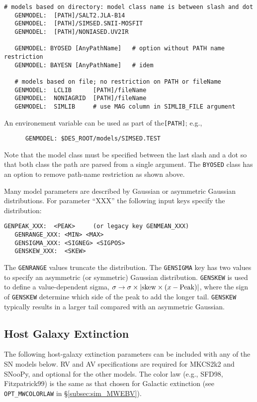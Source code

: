 \documentclass[12pt]{article}
\begin{document}
\begin{Verbatim}[frame=single]
   # models based on directory: model class name is between slash and dot
   GENMODEL:  [PATH]/SALT2.JLA-B14       
   GENMODEL:  [PATH]/SIMSED.SNII-MOSFIT
   GENMODEL:  [PATH]/NONIASED.UV2IR

   GENMODEL: BYOSED [AnyPathName]   # option without PATH name restriction
   GENMODEL: BAYESN [AnyPathName]   # idem

   # models based on file; no restriction on PATH or fileName
   GENMODEL:  LCLIB      [PATH]/fileName
   GENMODEL:  NONIAGRID  [PATH]/fileName
   GENMODEL:  SIMLIB     # use MAG column in SIMLIB_FILE argument
\end{Verbatim}
%
An environement variable can be used as part of the{\tt [PATH]};
e.g., 
\begin{verbatim}
      GENMODEL: $DES_ROOT/models/SIMSED.TEST
\end{verbatim}
%
Note that the model class must be specified between the last slash
and a dot so that both class the path are parsed from a single argument.
The {\tt BYOSED} class has an option to remove path-name restriction
as shown above.


\medskip
Many model parameters are described by Gaussian or asymmetric Gaussian
distributions.  For  parameter ``XXX'' the following input keys
specify the distribution:
\begin{Verbatim}[frame=single]
   GENPEAK_XXX:  <PEAK>     (or legacy key GENMEAN_XXX)
   GENRANGE_XXX: <MIN> <MAX>
   GENSIGMA_XXX: <SIGNEG> <SIGPOS>
   GENSKEW_XXX:  <SKEW>
\end{Verbatim}
%
The {\tt GENRANGE} values truncate the distribution.
The {\tt GENSIGMA} key has two values to specify an 
asymmetric (or symmetric) Gaussian distribution.  
{\tt GENSKEW} is used to define a value-dependent sigma,
$\sigma \to \sigma\times \vert{\rm skew}\times (x - {\rm Peak})\vert$,
where the sign of {\tt GENSKEW} determine which side of
the peak to add the longer tail.
{\tt GENSKEW} typically results in a larger tail compared with
an asymmetric Gaussian.

\clearpage
\subsection{Host Galaxy Extinction}
\label{subsec:host_extinct}

The following host-galaxy extinction parameters can be included
with any of the SN models below. RV and AV specifications are
required for MKCS2k2 and SNooPy, and optional for the other models.
The color law (e.g., SFD98, Fitzpatrick99) is the same
as that chosen for Galactic extinction
(see {\tt OPT\_MWCOLORLAW} in \S\ref{subsec:sim_MWEBV}).
\end{document}
